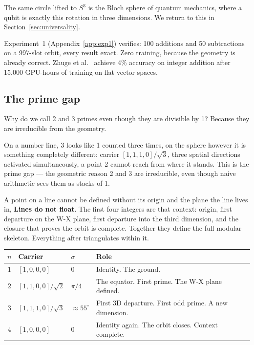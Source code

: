 \documentclass[12pt,a4paper]{article}
\theoremstyle{definition}
\theoremstyle{remark}
\begin{document}
The same circle lifted to $S^3$ is the Bloch sphere of quantum mechanics,
where a qubit is exactly this rotation in three dimensions. We return to
this in Section~\ref{sec:universality}.

Experiment~1 (Appendix~\ref{app:exp1}) verifies: 100 additions and 50
subtractions on a 997-slot orbit, every result exact. Zero training, because
the geometry is already correct. Zhuge et al.~\cite{zhuge2026} achieve 4\% accuracy on integer addition
after 15,000 GPU-hours of training on flat vector spaces.

\subsection{The prime gap}

Why do we call 2 and 3 primes even though they are divisible by 1? Because they are irreducible from the geometry.

On a number line, 3 looks like 1 counted three times, on the sphere however it is
something completely different: carrier $[1,1,1,0]/\sqrt{3}$, three spatial
directions activated simultaneously, a point 2 cannot reach from where it
stands. This is the prime gap --- the geometric reason 2 and 3 are
irreducible, even though naive arithmetic sees them as stacks of 1.

A point on a line cannot be defined without its origin and the plane the
line lives in, \textbf{Lines do not float}. The first four integers are that
context: origin, first departure on the W-X plane, first departure into
the third dimension, and the closure that proves the orbit is complete.
Together they define the full modular skeleton. Everything after
triangulates within it.

\begin{center}
\begin{tabular}{clll}
\toprule
$n$ & Carrier & $\sigma$ & Role \\
\midrule
$1$ & $[1,0,0,0]$ & $0$ & Identity. The ground. \\[4pt]
$2$ & $[1,1,0,0]/\sqrt{2}$ & $\pi/4$ & The equator. First prime. The W-X plane defined. \\[4pt]
$3$ & $[1,1,1,0]/\sqrt{3}$ & ${\approx}55^\circ$ & First 3D departure. First odd prime. A new dimension. \\[4pt]
$4$ & $[1,0,0,0]$ & $0$ & Identity again. The orbit closes. Context complete. \\
\bottomrule
\end{tabular}
\end{center}
\end{document}
